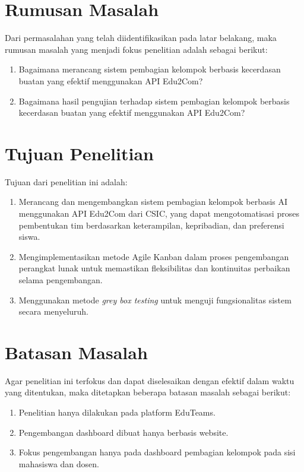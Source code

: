 \section{Rumusan Masalah} \label{I.Rumusan Masalah}
Dari permasalahan yang telah diidentifikasikan pada latar belakang, maka
rumusan masalah yang menjadi fokus penelitian adalah sebagai berikut:

\begin{enumerate}
	\item Bagaimana merancang sistem pembagian kelompok berbasis kecerdasan buatan yang efektif menggunakan API Edu2Com?
	\item Bagaimana hasil pengujian terhadap sistem pembagian kelompok berbasis kecerdasan buatan yang efektif menggunakan API Edu2Com?
\end{enumerate}

\section{Tujuan Penelitian} \label{I.Tujuan}
Tujuan dari penelitian ini adalah:

\begin{enumerate}
	\item Merancang dan mengembangkan sistem pembagian kelompok berbasis AI
	      menggunakan API Edu2Com dari CSIC, yang dapat mengotomatisasi proses
	      pembentukan tim berdasarkan keterampilan, kepribadian, dan preferensi siswa.
	\item Mengimplementasikan metode Agile Kanban dalam proses pengembangan
	      perangkat lunak untuk memastikan fleksibilitas dan kontinuitas perbaikan selama pengembangan.
	\item Menggunakan metode \textit{grey box testing} untuk menguji
	      fungsionalitas sistem secara menyeluruh.
\end{enumerate}

\section{Batasan Masalah}  \label{I.Batasan}
Agar penelitian ini terfokus dan dapat diselesaikan dengan efektif dalam waktu
yang ditentukan, maka ditetapkan beberapa batasan masalah sebagai berikut:

\begin{enumerate}
	\item Penelitian hanya dilakukan pada platform EduTeams.
	\item Pengembangan dashboard dibuat hanya berbasis website.
	\item Fokus pengembangan hanya pada dashboard pembagian kelompok pada sisi
	      mahasiswa dan dosen.
\end{enumerate}

